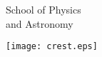 \makeatletter
\begin{titlepage}
\begin{minipage}[b]{0.8\textwidth}
        {\Huge School of Physics\\ and Astronomy\\}
\end{minipage}
\hfill
\begin{minipage}[t]{40mm}
        \texttt{[image: crest.eps]}
\end{minipage}
\vspace*{4cm}

{\centering
{\huge{} \@title\\}
{\Huge{} \@subtitle\\}
\vspace{\fill}
{\Large \@author \\[1cm] \LARGE\bfseries \@date\\}
}
\end{titlepage}
\makeatother
